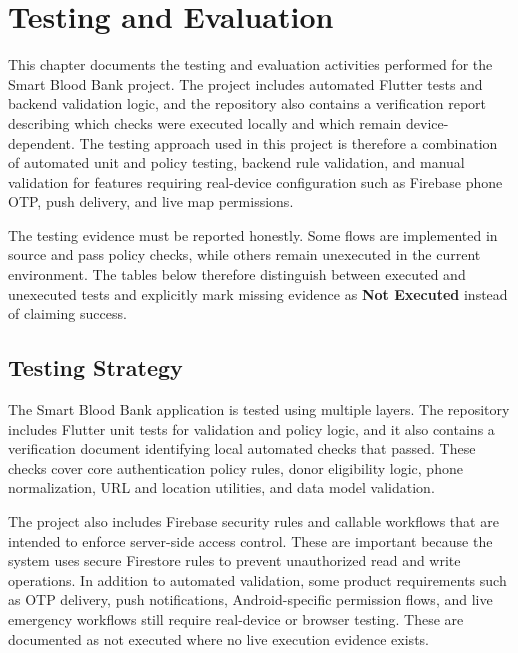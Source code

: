 ﻿%

\chapter{Testing and Evaluation}

This chapter documents the testing and evaluation activities performed for the Smart Blood Bank project. The project includes automated Flutter tests and backend validation logic, and the repository also contains a verification report describing which checks were executed locally and which remain device-dependent. The testing approach used in this project is therefore a combination of automated unit and policy testing, backend rule validation, and manual validation for features requiring real-device configuration such as Firebase phone OTP, push delivery, and live map permissions.

The testing evidence must be reported honestly. Some flows are implemented in source and pass policy checks, while others remain unexecuted in the current environment. The tables below therefore distinguish between executed and unexecuted tests and explicitly mark missing evidence as \textbf{Not Executed} instead of claiming success.


\section{Testing Strategy}

The Smart Blood Bank application is tested using multiple layers. The repository includes Flutter unit tests for validation and policy logic, and it also contains a verification document identifying local automated checks that passed. These checks cover core authentication policy rules, donor eligibility logic, phone normalization, URL and location utilities, and data model validation.

The project also includes Firebase security rules and callable workflows that are intended to enforce server-side access control. These are important because the system uses secure Firestore rules to prevent unauthorized read and write operations. In addition to automated validation, some product requirements such as OTP delivery, push notifications, Android-specific permission flows, and live emergency workflows still require real-device or browser testing. These are documented as not executed where no live execution evidence exists.

